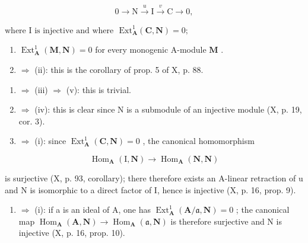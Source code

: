 \[
0 \rightarrow \mathrm{N} \xrightarrow {u} \mathrm{I} \xrightarrow {v} \mathrm{C} \rightarrow 0,
\]

\(\text{where I is injective and where } \text{ Ext}_{\mathbf{A}}^{1} (\mathbf{C}, \mathbf{N}) = 0;\)

\begin{enumerate}
\def\labelenumi{(\alph{enumi})}
\setcounter{enumi}{21}
\item
  \(\operatorname{Ext}_{\mathbf{A}}^{1}(\mathbf{M},\mathbf{N}) = 0\) for every monogenic A-module \(\mathbf{M}\) .
\item
  \(\Rightarrow\) (ii): this is the corollary of prop. 5 of X, p. 88.
\end{enumerate}

\begin{enumerate}
\def\labelenumi{(\roman{enumi})}
\setcounter{enumi}{1}
\item
  \(\Rightarrow\) (iii) \(\Rightarrow\) (v): this is trivial.
\item
  \(\Rightarrow\) (iv): this is clear since N is a submodule of an injective module (X, p. 19, cor. 3).
\item
  \(\Rightarrow\) (i): since \(\operatorname{Ext}_{\mathbf{A}}^{1}(\mathbf{C},\mathbf{N}) = 0\) , the canonical homomorphism
\end{enumerate}

\[
\operatorname{Hom} _ {\mathbf {A}} (\mathrm{I}, \mathbf {N}) \rightarrow \operatorname{Hom} _ {\mathbf {A}} (\mathbf {N}, \mathbf {N})
\]

is surjective (X, p. 93, corollary); there therefore exists an A-linear retraction of u and N is isomorphic to a direct factor of I, hence is injective (X, p. 16, prop. 9).

\begin{enumerate}
\def\labelenumi{(\alph{enumi})}
\setcounter{enumi}{21}
\tightlist
\item
  \(\Rightarrow\) (i): if a is an ideal of A, one has \(\operatorname{Ext}_{\mathbf{A}}^{1}(\mathbf{A}/\mathfrak{a},\mathbf{N})=0\) ; the canonical map \(\operatorname{Hom}_{\mathbf{A}}(\mathbf{A},\mathbf{N})\to\operatorname{Hom}_{\mathbf{A}}(\mathfrak{a},\mathbf{N})\) is therefore surjective and N is injective (X, p. 16, prop. 10).
\end{enumerate}


